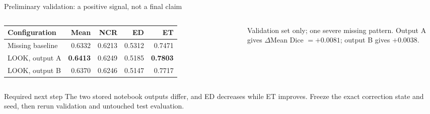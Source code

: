 \documentclass[aspectratio=169,11pt]{beamer}
\begin{document}
\begin{frame}{Preliminary validation: a positive signal, not a final claim}
  \begin{columns}[T,onlytextwidth]
      \begin{table}
        \footnotesize
        \setlength{\tabcolsep}{3pt}
        \begin{tabular}{lrrrr}
          \toprule
          Configuration & Mean & NCR & ED & ET \\
          \midrule
          Missing baseline & 0.6332 & 0.6213 & 0.5312 & 0.7471 \\
          LOOK, output A & \textbf{0.6413} & 0.6249 & 0.5185 & \textbf{0.7803} \\
          LOOK, output B & 0.6370 & 0.6246 & 0.5147 & 0.7717 \\
          \bottomrule
        \end{tabular}
      \end{table}
      \footnotesize Validation set only; one severe missing pattern. Output A gives
      $\Delta$Mean Dice $=+0.0081$; output B gives $+0.0038$.
  \end{columns}
  \begin{alertblock}{Required next step}
    The two stored notebook outputs differ, and ED decreases while ET improves. Freeze the exact
    correction state and seed, then rerun validation and untouched test evaluation.
  \end{alertblock}
\end{frame}
\end{document}
